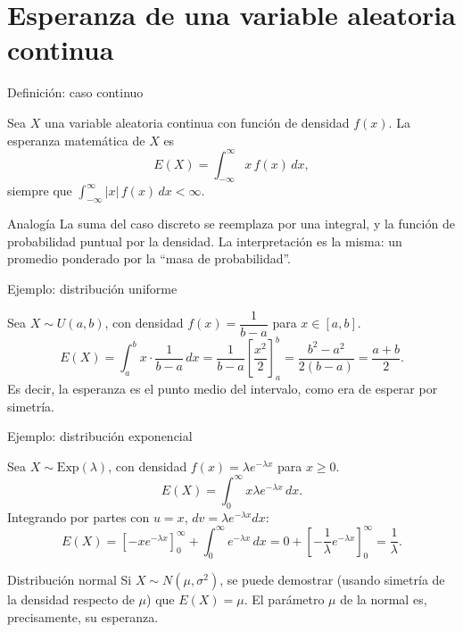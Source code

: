 \documentclass[aspectratio=169,11pt]{beamer}
\begin{document}
\section{Esperanza de una variable aleatoria continua}

\begin{frame}{Definición: caso continuo}
\begin{definition}
Sea $X$ una variable aleatoria continua con función de densidad $f(x)$. La esperanza matemática de $X$ es
\[
E(X) = \int_{-\infty}^{\infty} x\, f(x)\, dx,
\]
siempre que $\displaystyle\int_{-\infty}^{\infty} |x|\, f(x)\, dx < \infty$.
\end{definition}

\begin{block}{Analogía}
La suma del caso discreto se reemplaza por una integral, y la función de probabilidad puntual por la densidad. La interpretación es la misma: un promedio ponderado por la ``masa de probabilidad''.
\end{block}
\end{frame}

\begin{frame}{Ejemplo: distribución uniforme}
\begin{example}
Sea $X \sim U(a,b)$, con densidad $f(x) = \dfrac{1}{b-a}$ para $x \in [a,b]$.
\[
E(X) = \int_a^b x \cdot \frac{1}{b-a}\, dx = \frac{1}{b-a}\left[\frac{x^2}{2}\right]_a^b = \frac{b^2 - a^2}{2(b-a)} = \frac{a+b}{2}.
\]
Es decir, la esperanza es el punto medio del intervalo, como era de esperar por simetría.
\end{example}
\end{frame}

\begin{frame}{Ejemplo: distribución exponencial}
\begin{example}
Sea $X \sim \text{Exp}(\lambda)$, con densidad $f(x) = \lambda e^{-\lambda x}$ para $x \geq 0$.
\[
E(X) = \int_0^\infty x \lambda e^{-\lambda x}\, dx.
\]
Integrando por partes con $u = x$, $dv = \lambda e^{-\lambda x} dx$:
\[
E(X) = \left[-x e^{-\lambda x}\right]_0^\infty + \int_0^\infty e^{-\lambda x}\, dx = 0 + \left[-\frac{1}{\lambda} e^{-\lambda x}\right]_0^\infty = \frac{1}{\lambda}.
\]
\end{example}

\begin{block}{Distribución normal}
Si $X \sim N(\mu, \sigma^2)$, se puede demostrar (usando simetría de la densidad respecto de $\mu$) que $E(X) = \mu$. El parámetro $\mu$ de la normal es, precisamente, su esperanza.
\end{block}
\end{frame}
\end{document}
